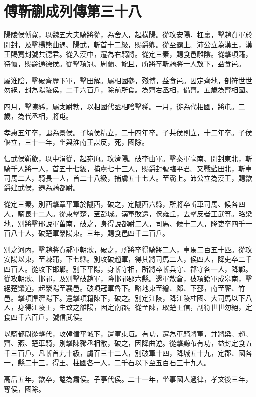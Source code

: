 \chapter{傅靳蒯成列傳第三十八}

陽陵侯傅寬，以魏五大夫騎將從，為舍人，起橫陽。從攻安陽、杠裏，擊趙賁軍於開封，及擊楊熊曲遇、陽武，斬首十二級，賜爵卿。從至霸上。沛公立為漢王，漢王賜寬封號共德君。從入漢中，遷為右騎將。從定三秦，賜食邑雕陰。從擊項籍，待懷，賜爵通德侯。從擊項冠、周蘭、龍且，所將卒斬騎將一人敖下，益食邑。

屬淮陰，擊破齊歷下軍，擊田解。屬相國參，殘博，益食邑。因定齊地，剖符世世勿絕，封為陽陵侯，二千六百戶，除前所食。為齊右丞相，備齊。五歲為齊相國。

四月，擊陳豨，屬太尉勃，以相國代丞相噲擊豨。一月，徙為代相國，將屯。二歲，為代丞相，將屯。

孝惠五年卒，謚為景侯。子頃侯精立，二十四年卒。子共侯則立，十二年卒。子侯偃立，三十一年，坐與淮南王謀反，死，國除。

信武侯靳歙，以中涓從，起宛朐。攻濟陽。破李由軍。擊秦軍亳南、開封東北，斬騎千人將一人，首五十七級，捕虜七十三人，賜爵封號臨平君。又戰藍田北，斬車司馬二人，騎長一人，首二十八級，捕虜五十七人。至霸上。沛公立為漢王，賜歙爵建武侯，遷為騎都尉。

從定三秦。別西擊章平軍於隴西，破之，定隴西六縣，所將卒斬車司馬、候各四人，騎長十二人。從東擊楚，至彭城。漢軍敗還，保雍丘，去擊反者王武等。略梁地，別將擊邢說軍菑南，破之，身得說都尉二人，司馬、候十二人，降吏卒四千一百八十人。破楚軍滎陽東。三年，賜食邑四千二百戶。

別之河內，擊趙將賁郝軍朝歌，破之，所將卒得騎將二人，車馬二百五十匹。從攻安陽以東，至棘蒲，下七縣。別攻破趙軍，得其將司馬二人，候四人，降吏卒二千四百人。從攻下邯鄲。別下平陽，身斬守相，所將卒斬兵守、郡守各一人，降鄴。從攻朝歌、邯鄲，及別擊破趙軍，降邯鄲郡六縣。還軍敖倉，破項籍軍成皋南，擊絕楚馕道，起滎陽至襄邑。破項冠軍魯下。略地東至繒、郯、下邳，南至蘄、竹邑。擊項悍濟陽下。還擊項籍陳下，破之。別定江陵，降江陵柱國、大司馬以下八人，身得江陵王，生致之雒陽，因定南郡。從至陳，取楚王信，剖符世世勿絕，定食四千六百戶，號信武侯。

以騎都尉從擊代，攻韓信平城下，還軍東垣。有功，遷為車騎將軍，并將梁、趙、齊、燕、楚車騎，別擊陳豨丞相敞，破之，因降曲逆。從擊黥布有功，益封定食五千三百戶。凡斬首九十級，虜百三十二人，別破軍十四，降城五十九，定郡、國各一，縣二十三，得王、柱國各一人，二千石以下至五百石三十九人。

高后五年，歙卒，謚為肅侯。子亭代侯。二十一年，坐事國人過律，孝文後三年，奪侯，國除。

